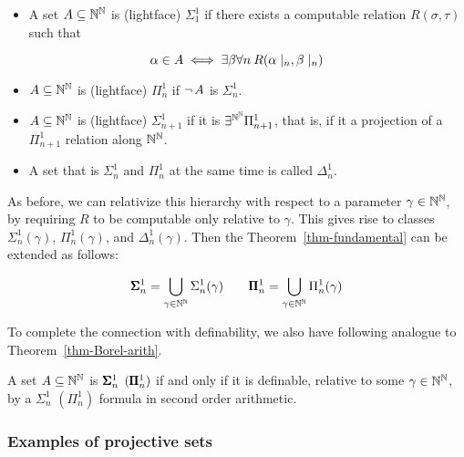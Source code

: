 \begin{definition}[Kleene]\label{def-analytical-hierarchy}\begin{itemize}
\item A set $A \subseteq \mathbb{N}^{\mathbb{N}}$ is (lightface) $\Sigma^1_1$ if there exists a computable relation $R(\sigma, \tau)$ such that
\end{itemize}

\begin{equation}
\alpha \in A \iff \exists \beta \forall n \: R(\alpha\mid_{n},\beta\mid_{n})
\end{equation}

\begin{itemize}
\item $A \subseteq \mathbb{N}^{\mathbb{N}}$ is (lightface) $\Pi^1_n$ if $\neg \, A$ is $\Sigma^1_n$.


\item $A \subseteq \mathbb{N}^{\mathbb{N}}$ is (lightface) $\Sigma^1_{n+1}$ if it is $\exists^{\mathbb{N}^{\mathbb{N}}} \Pi^1_{n+1}$, that is, if it a projection of a $\Pi^1_{n+1}$ relation along $\mathbb{N}^{\mathbb{N}}$.


\item A set that is $\Sigma^1_n$ and $\Pi^1_n$ at the same time is called $\Delta^1_n$.
\end{itemize}

\end{definition}As before, we can relativize this hierarchy with respect to a parameter $\gamma \in \mathbb{N}^{\mathbb{N}}$, by requiring $R$ to be computable only relative to $\gamma$. This gives rise to classes $\Sigma^1_n(\gamma)$, $\Pi^1_n(\gamma)$, and $\Delta^1_n(\gamma)$. Then the Theorem~\ref{thm-fundamental} can be extended as follows:

\begin{equation}
\pmb{\Sigma}^{1}_{n} = \bigcup_{\gamma \in \mathbb{N}^{\mathbb{N}}} \Sigma^1_n(\gamma) \qquad \pmb{\Pi}^1_{n} = \bigcup_{\gamma \in \mathbb{N}^{\mathbb{N}}} \Pi^1_n(\gamma)
\end{equation}

To complete the connection with definability, we also have following analogue to Theorem~\ref{thm-Borel-arith}.

\begin{theorem}\label{thm-projective-definable}A set $A \subseteq \mathbb{N}^{\mathbb{N}}$ is $\pmb{\Sigma}^1_n$ $(\pmb{\Pi}^1_n)$ if and only if it is definable, relative to some $\gamma \in \mathbb{N}^{\mathbb{N}}$, by a $\Sigma^1_n$ $(\Pi^1_n)$ formula in second order arithmetic.

\end{theorem}\subsubsection{Examples of projective sets}

